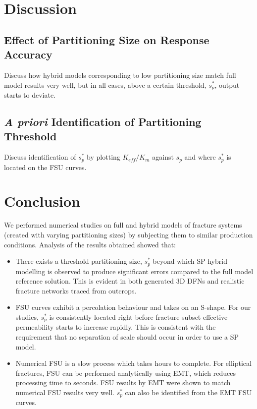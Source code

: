 \documentclass[a4paper]{article}
\begin{document}
\section{Discussion}
\subsection{Effect of Partitioning Size on Response Accuracy}
Discuss how hybrid models corresponding to low partitioning size match full model results very well, but in all cases, above a certain threshold, $s_p^*$, output starts to deviate.

\subsection{\textit{A priori} Identification of Partitioning Threshold}
Discuss identification of $s_p^*$ by plotting $K_{eff}/K_m$ against $s_p$ and where $s_p^*$ is located on the FSU curves.

\section{Conclusion}
We performed numerical studies on full and hybrid models of fracture systems (created with varying partitioning sizes) by subjecting them to similar production conditions. Analysis of the results obtained showed that:

\begin{itemize}
    \item There exists a threshold partitioning size, $s_p^*$ beyond which SP hybrid modelling is observed to produce significant errors compared to the full model reference solution. This is evident in both generated 3D DFNs and realistic fracture networks traced from outcrops.
    
    \item FSU curves exhibit a percolation behaviour and takes on an S-shape. For our studies, $s_p^*$ is consistently located right before fracture subset effective permeability starts to increase rapidly. This is consistent with the requirement that no separation of scale should occur in order to use a SP model.
    
    \item Numerical FSU is a slow process which takes hours to complete. For elliptical fractures, FSU can be performed analytically using EMT, which reduces processing time to seconds. FSU results by EMT were shown to match numerical FSU results very well. $s_p^*$ can also be identified from the EMT FSU curves. 
    
\end{itemize}



\end{document}
